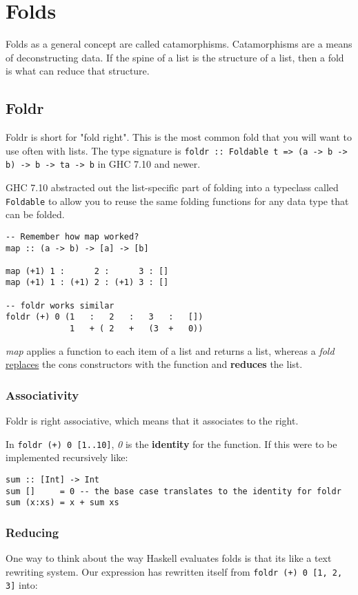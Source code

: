 \section{Folds}
Folds as a general concept are called catamorphisms. Catamorphisms are a means of deconstructing data. If the spine of a list is the structure of a list, then a fold is what can reduce that structure.

\subsection{Foldr}
Foldr is short for "fold right". This is the most common fold that you will want to use often with lists. The type signature is \texttt{foldr :: Foldable t => (a -> b -> b) -> b -> ta -> b} in GHC 7.10 and newer.

GHC 7.10 abstracted out the list-specific part of folding into a typeclass called \texttt{Foldable} to allow you to reuse the same folding functions for any data type that can be folded.

\begin{lstlisting}
-- Remember how map worked?
map :: (a -> b) -> [a] -> [b]

map (+1) 1 :      2 :      3 : []
map (+1) 1 : (+1) 2 : (+1) 3 : []

-- foldr works similar
foldr (+) 0 (1   :   2   :   3   :   [])
             1   + ( 2   +   (3  +   0))
\end{lstlisting}

\emph{map} applies a function to each item of a list and returns a list, whereas a \emph{fold} \underline{replaces} the cons constructors with the function and \textbf{reduces} the list.

\subsubsection{Associativity}
Foldr is right associative, which means that it associates to the right.

In \texttt{foldr (+) 0 [1..10]}, \emph{0} is the \textbf{identity} for the function. If this were to be implemented recursively like:

\begin{lstlisting}
sum :: [Int] -> Int
sum []     = 0 -- the base case translates to the identity for foldr
sum (x:xs) = x + sum xs 
\end{lstlisting}

\newpage
\subsubsection{Reducing}
One way to think about the way Haskell evaluates folds is that its like a text rewriting system. Our expression has rewritten itself from \texttt{foldr (+) 0 [1, 2, 3]} into:

